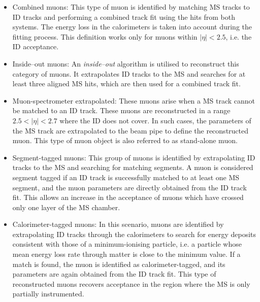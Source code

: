 \begin{itemize}
	\item Combined muons: This type of muon is identified by matching MS tracks to ID 
	tracks and performing a combined track fit using the hits from both systems. The energy
	loss in the calorimeters is taken into account during the fitting process.
	This definition works only for muons within $|\eta| < 2.5$, i.e. the ID acceptance.

	\item Inside--out muons: An \textit{inside--out} algorithm is utilised to reconstruct this category
	of muons. It extrapolates ID tracks to the MS and searches for at least three aligned MS 
	hits, which are then used for a combined track fit.

	\item Muon-spectrometer extrapolated: These muons arise when a MS track cannot be
	matched to an ID track. These muons are reconstructed in a range $2.5 < |\eta| < 2.7$ where the ID does not cover.
	In such cases, the parameters of the MS track are extrapolated to 
	the beam pipe to define the reconstructed muon. This type of 
	muon object is also referred to as stand-alone muon.

	\item Segment-tagged muons: This group of muons is identified by extrapolating ID tracks 
	to the MS and searching for matching segments. A muon is considered segment tagged if 
	an ID track is successfully matched to at least one MS segment, and the muon parameters 
	are directly obtained from the ID track fit. This allows an increase in the acceptance of
	muons which have crossed only one layer of the MS chamber.

	\item Calorimeter-tagged muons: In this scenario, muons are identified by extrapolating ID 
	tracks through the calorimeters to search for energy deposits consistent with those of a 
	minimum-ionising particle, i.e. a particle whose mean energy loss rate through matter is 
	close to the minimum value. If a match is found, the muon is identified as 
	calorimeter-tagged, and its parameters are again obtained from the ID track fit.	
	This type of reconstructed muons recovers acceptance in the region where 
	the MS is only partially instrumented.
\end{itemize}



